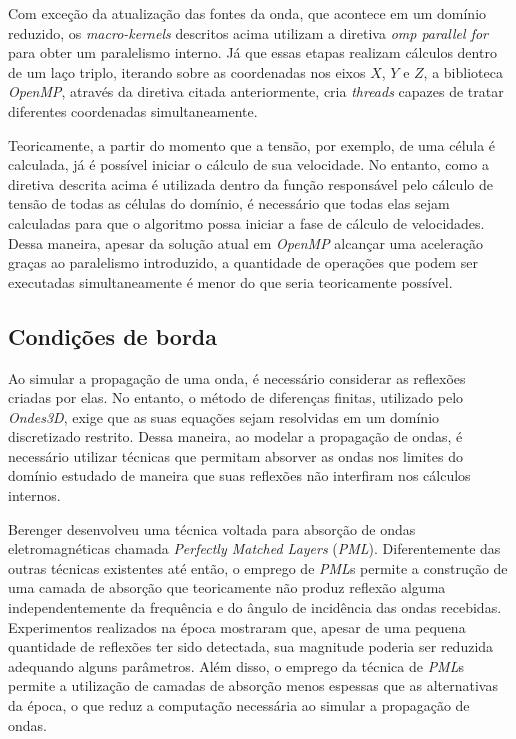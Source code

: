 \documentclass[cic,tc]{iiufrgs}
\begin{document}
Com exceção da atualização das fontes da onda, que acontece em um domínio reduzido, os \textit{macro-kernels} descritos acima utilizam a diretiva \textit{omp parallel for}
para obter um paralelismo interno. Já que essas etapas realizam cálculos dentro de um laço triplo, iterando sobre as coordenadas nos eixos $X$, $Y$ e $Z$, a biblioteca \textit{OpenMP},
através da diretiva citada anteriormente, cria \textit{threads} capazes de tratar diferentes coordenadas simultaneamente.

Teoricamente, a partir do momento que a tensão, por exemplo, de uma célula é calculada, já é possível iniciar o cálculo de sua velocidade. No entanto, como a diretiva descrita acima 
é utilizada dentro da função responsável pelo cálculo de tensão de todas as células do domínio, é necessário que todas elas sejam calculadas para que o algoritmo possa iniciar a fase de
cálculo de velocidades. Dessa maneira, apesar da solução atual em \textit{OpenMP} alcançar uma aceleração graças ao paralelismo introduzido, a quantidade de operações que podem ser executadas simultaneamente
é menor do que seria teoricamente possível. 

\subsection{Condições de borda}

Ao simular a propagação de uma onda, é necessário considerar as reflexões criadas por elas. No entanto, o método de diferenças finitas, utilizado pelo \textit{Ondes3D}, exige que as suas
equações sejam resolvidas em um domínio discretizado restrito. Dessa maneira, ao modelar a propagação de ondas, é necessário utilizar técnicas que permitam absorver as ondas nos limites
do domínio estudado de maneira que suas reflexões não interfiram nos cálculos internos.

Berenger \cite{PML} desenvolveu uma técnica voltada para absorção de ondas eletromagnéticas chamada \textit{Perfectly Matched Layers} (\textit{PML}). Diferentemente
das outras técnicas existentes até então, o emprego de \textit{PML}s permite a construção de uma camada de absorção que teoricamente não produz reflexão alguma independentemente
da frequência e do ângulo de incidência das ondas recebidas. Experimentos realizados na época mostraram que, apesar de uma pequena quantidade de reflexões ter sido detectada,
sua magnitude poderia ser reduzida adequando alguns parâmetros. Além disso, o emprego da técnica de \textit{PML}s permite a utilização de camadas de absorção menos espessas que as
alternativas da época, o que reduz a computação necessária ao simular a propagação de ondas.
\end{document}
